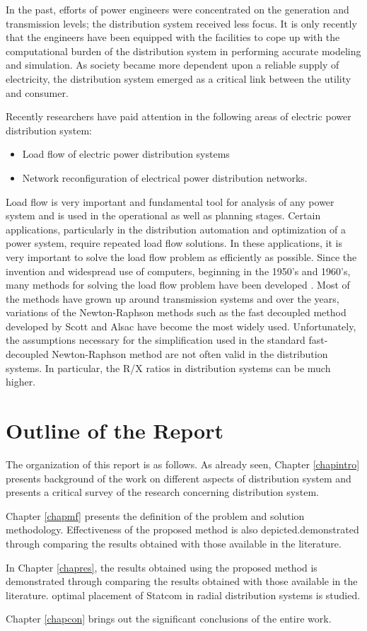 \documentclass[a4paper,12pt,oneside]{report}%
\begin{document}
In the past, efforts of power engineers were concentrated on the generation and transmission levels; the distribution system received less focus. It is only recently that the engineers have been equipped with the facilities to cope up with the computational burden of the distribution system in performing accurate modeling and simulation. As society became more dependent upon a reliable supply of electricity, the distribution system emerged as a critical link between the utility and consumer.
\par
Recently researchers have paid attention in the following areas of electric power distribution system:
\begin{itemize}
\item Load flow of electric power distribution systems
\item Network reconfiguration of electrical power distribution networks.
\end{itemize}

\par
Load flow is very important and fundamental tool for analysis of any power system and is used in the operational as well as planning stages. Certain applications, particularly in the distribution automation and optimization of a power system, require repeated load flow solutions. In these applications, it is very important to solve the load flow problem as efficiently as possible. Since the invention and widespread use of computers, beginning in the 1950's and 1960's, many methods for solving the load flow problem have been developed \cite{pas:tinney}. Most of the methods have grown up around transmission systems and over the years, variations of the Newton-Raphson methods such as the fast decoupled method developed by Scott and Alsac \cite{pas:scott} have become the most widely used.
Unfortunately, the assumptions necessary for the simplification used in the standard fast-decoupled Newton-Raphson method are not often valid in the distribution systems. In particular, the R/X ratios in distribution systems can be much higher.

\section{Outline of the Report}

The organization of this report is as follows. As already seen, Chapter \ref{chapintro} presents background of the work on different aspects of distribution system and presents a critical survey of the research concerning distribution system.
\par
Chapter \ref{chapmf} presents the definition of the problem and solution methodology. Effectiveness of the proposed method is also depicted.demonstrated through comparing the results obtained with those available in the literature.
\par
In Chapter \ref{chapres}, the results obtained using the proposed method is demonstrated through comparing the results obtained with those available in the literature. optimal placement of Statcom in radial distribution systems is studied.
\par
Chapter \ref{chapcon} brings out the significant conclusions of the entire work.
\end{document}
